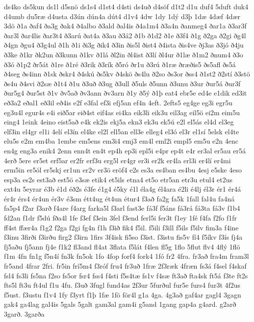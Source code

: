 {ds4ko
ds5kun
ds1l
d5snö
ds1s4
d1st4
d4sti
ds4uð
d4söf
d1t2
d1u
duf4
5duft
duk4
d4umb
du5ræ
d4usta
d3ún
dún4a
dút4
d1v4
4dw
1dy
1dý
d3þ
1dæ
4dæf
4dær
3dö
ð1a
ðaf4
ða3g
ðak4
ð4albo
ð3ald
ðal4is
ð4a1m4
ð3a4n
ðanmeg4
ðar1a
ð3ar3f
ðar3l
ðar4lis
ðar3t4
ð3arú
ðat4a
ð3au
ð3á2
ð1b
ð1d2
ð1e
ð3f4
ð1g
ð2ga
ð2gi
ðg4l
ð4gn
ðgu4
ð3g4ul
ð1h
ð1i
ði3g
ðik4
ð3in
ðis5l
ðist4
ð4ista
ðis4ve
ðj3as
ð3jó
ð4ju
ð3ke
ð1kr
ðk2un
ð3kunn
ð1kv
ð1lá
ðl2in
ðl4ist
ð3lí
ðl4ur
ð1læ
ð1m2
ðnum4
ð3o
ð3ó
ð1p2
ðr5át
ð1re
ð1ré
ð3rik
ð3rík
ð5ró
ðr1u
ð3rú
ð1ræ
ðræðis5
ðs5afl
ðs5á
ð4seg
ðs4inn
ð1sk
ðskr4
ð4skú
ðs5kv
ð4skö
ðs4lu
ð2so
ðs3or
ðss4
ð1st2
ð2stí
ð3stö
ðs4u
ð4svi
ð2sæ
ð1t4
ð1u
ð3uð
ð3ug
ð3ull
ð5uls
ð5unn
ð3unu
ð3ur
ður5á
ður3f
ður5g4
ður5st
ð1v
ðv5að
ðv3ann
ðv3arn
ð1y
ð5ý
ð1þ
eat4
ebr5e
ed4e
e1dik
ed3it
eð3a2
eðal1
eð3il
eð4is
e2f
e3fal
ef3i
efj5an
ef4n
4eft.
2efts5
eg4ge
eg3i
egr5u
eg3u4l
egur4s
e4i
eið5ar
eið4st
eif4as
ei4ka
eik3li
eik3u
eil3ag
eil5ö
ei2m
eim5u
eing4
1eink
4eino
eist5að
e4k
ek2is
ekj5a
ekn3
ek3u
ek5ú
e2l
el5ás
el4d
el3eg
elf3in
el4gr
el1i
4elí
el3ín
el4ke
el2l
ell5an
ell3e
elleg4
el3ó
el3r
el1sí
5elsk
el4te
elu5s
e2m
em4ba
1embe
em5ens
em3i4
emj3
em4l
eml2i
empl5
em5u
e2n
4enc
en4g
eng3a
enik4
2enn
enn4t
en4t
ep4h
ep3i
epl5i
e4pr
ep4t
e4r
er3al
er5au
er5á
4erð
5ere
er5et
erf5ar
er2fr
erf3u
erg5l
er4gr
er3i
er2k
er4la
erl3i
er4lí
er4mi
erm5in
er5ól
er5skj
er1un
er2v
er3ö
eröf4
e2s
es3a
es4ban
es4bu
4esj
e5ske
4eso
esp3a
es2s
est3að
est5ö
e3sæ
etik4
et5ils
etna4
et5o
etr5an
etr3u
etul4
et2us
ext4u
5eyrar
é3b
é1d
éð2s
é3fe
é1g4
é5ky
é1l
éla4g
él4ara
é2li
é4lj
él3r
ér1
ér4á
ér4r
érs4
ér4un
ér3v
é3sm
étt4ug
ét4un
étur4
f3að
fa2g
fa5k
1fall
fal4u
fa4ná
fa5p4
f2ar
f3arð
f4are
f4arg
farka5l
f3arl
fast3e
fá3f
f5áns
fá3rá
fá3ta
fá3v
f1b4
fd2an
f1dr
f5dú
fða4l
1fe
f3ef
f3ein
3fel
f3end
ferl5i
fer3t
f1ey
1fé
f4fa
f2fo
f1fr
ff4st
ffær4a
f1g2
f2ga
f2gi
fg4n
f1h
f3ið
fik4
f5il.
f5ili
f3ill
f5ils
f5ilv
fim3a
f4ine
f3inu
3firði
f3irðu
firg2
f3irn
1firs
3f4isk
fi5so
f3ist.
f3istu
fis5v
fí4
f5íkv
f3ís
fj4a
fj5aðu
fj5ann
fj4e
f1k2
fl3and
fl4at
3flata
f5lát
f4len
fl5g
1flo
5flut
flv4
4flý
1flö
f1m
4fn
fn1g
f5n4í
fn3k
fn5ok
1fo
4fop
forf4
fork4
1fó
fr2
4fra.
fr3að
fra4m
fram3l
fr5and
4frar
2fri.
fr5in
frí5m4
f3róf
fru4
fr3uð
1fræ
2f3ræk
4fræn
fs3á
f4sel
f4skaf
fsl4
fs3li
fs5na
f2so
fs5or
fsr4
fss4
f4sti
f5s4tæ
fs1v
f4sæ
ft3að
fta4sk
ft5á
f3te
ft2s
fts5l
ft3u
ft4ul
f1u
4fu.
f3uð
3fugl
fund4as
2f3ur
5furðul
fur5e
furs4
fur3t
4f2us
f5ust.
f3ustu
f1v4
1fy
f3yrt
f1þ
1fæ
1fö
för4l
g1a
4ga.
4g3að
gaf4ar
gagl4
3gagn
gak4
ga4lag
gal4is
5gals
5galt
gam3al
gam4i
g5and
1gang
gap4a
g4ard.
g2arð
3garð.
3garða
}

